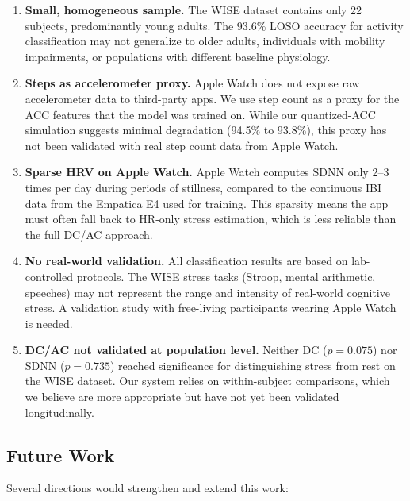\documentclass[12pt,letterpaper]{article}
\begin{document}
\begin{enumerate}
    \item \textbf{Small, homogeneous sample.} The WISE dataset contains only 22 subjects, predominantly young adults. The 93.6\% LOSO accuracy for activity classification may not generalize to older adults, individuals with mobility impairments, or populations with different baseline physiology.

    \item \textbf{Steps as accelerometer proxy.} Apple Watch does not expose raw accelerometer data to third-party apps. We use step count as a proxy for the ACC features that the model was trained on. While our quantized-ACC simulation suggests minimal degradation (94.5\% to 93.8\%), this proxy has not been validated with real step count data from Apple Watch.

    \item \textbf{Sparse HRV on Apple Watch.} Apple Watch computes SDNN only 2--3 times per day during periods of stillness, compared to the continuous IBI data from the Empatica E4 used for training. This sparsity means the app must often fall back to HR-only stress estimation, which is less reliable than the full DC/AC approach.

    \item \textbf{No real-world validation.} All classification results are based on lab-controlled protocols. The WISE stress tasks (Stroop, mental arithmetic, speeches) may not represent the range and intensity of real-world cognitive stress. A validation study with free-living participants wearing Apple Watch is needed.

    \item \textbf{DC/AC not validated at population level.} Neither DC ($p = 0.075$) nor SDNN ($p = 0.735$) reached significance for distinguishing stress from rest on the WISE dataset. Our system relies on within-subject comparisons, which we believe are more appropriate but have not yet been validated longitudinally.
\end{enumerate}

\subsection{Future Work}

Several directions would strengthen and extend this work:
\end{document}
